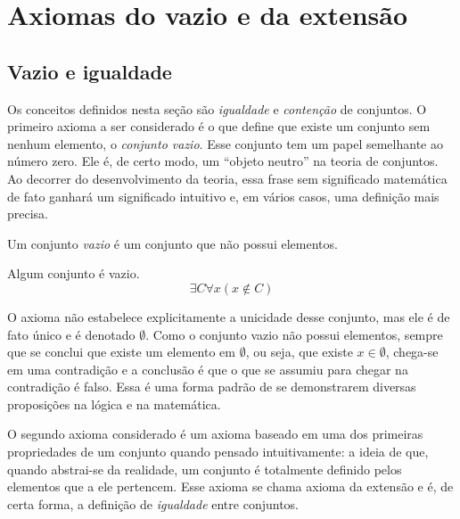 \section{Axiomas do vazio e da extensão}

\subsection{Vazio e igualdade}

Os conceitos definidos nesta seção são \emph{igualdade} e \emph{contenção} de conjuntos. O primeiro axioma a ser considerado é o que define que existe um conjunto sem nenhum elemento, o \emph{conjunto vazio}. Esse conjunto tem um papel semelhante ao número zero. Ele é, de certo modo, um ``objeto neutro'' na teoria de conjuntos. Ao decorrer do desenvolvimento da teoria, essa frase sem significado matemática de fato ganhará um significado intuitivo e, em vários casos, uma definição mais precisa.

\begin{definition}
Um conjunto \emph{vazio} é um conjunto que não possui elementos.
\end{definition}

\setcounter{axiom}{-1}

\begin{axiom}[Vazio]
Algum conjunto é vazio.
	\begin{equation*}
	\exists C \forall x(x \notin C)
	\end{equation*}
\end{axiom}

O axioma não estabelece explicitamente a unicidade desse conjunto, mas ele é de fato único e é denotado $\emptyset$. Como o conjunto vazio não possui elementos, sempre que se conclui que existe um elemento em $\emptyset$, ou seja, que existe $x \in \emptyset$, chega-se em uma contradição e a conclusão é que o que se assumiu para chegar na contradição é falso. Essa é uma forma padrão de se demonstrarem diversas proposições na lógica e na matemática.

O segundo axioma considerado é um axioma baseado em uma dos primeiras propriedades de um conjunto quando pensado intuitivamente: a ideia de que, quando abstrai-se da realidade, um conjunto é totalmente definido pelos elementos que a ele pertencem. Esse axioma se chama axioma da extensão e é, de certa forma, a definição de \emph{igualdade} entre conjuntos.

